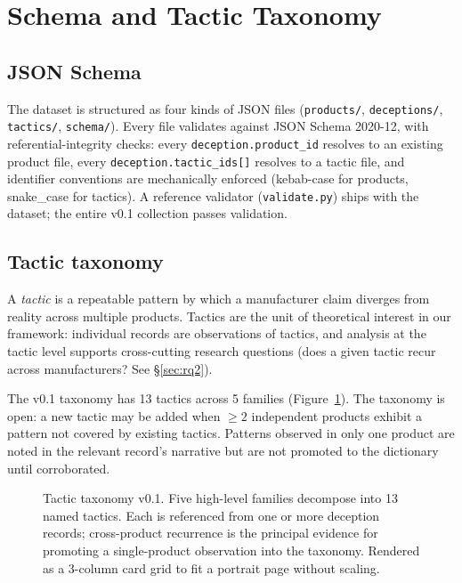 \documentclass{article}
\begin{document}
\section{Schema and Tactic Taxonomy}\label{sec:taxonomy}

\subsection{JSON Schema}\label{sec:schema}

The dataset is structured as four kinds of JSON files (\texttt{products/}, \texttt{deceptions/}, \texttt{tactics/}, \texttt{schema/}). Every file validates against JSON Schema 2020-12, with referential-integrity checks: every \texttt{deception.product\_id} resolves to an existing product file, every \texttt{deception.tactic\_ids[]} resolves to a tactic file, and identifier conventions are mechanically enforced (kebab-case for products, snake\_case for tactics). A reference validator (\texttt{validate.py}) ships with the dataset; the entire v0.1 collection passes validation.

\subsection{Tactic taxonomy}

A \emph{tactic} is a repeatable pattern by which a manufacturer claim diverges from reality across multiple products. Tactics are the unit of theoretical interest in our framework: individual records are observations of tactics, and analysis at the tactic level supports cross-cutting research questions (does a given tactic recur across manufacturers? See \S\ref{sec:rq2}).

The v0.1 taxonomy has 13 tactics across 5 families (Figure~\ref{fig:taxonomy}). The taxonomy is open: a new tactic may be added when $\geq 2$ independent products exhibit a pattern not covered by existing tactics. Patterns observed in only one product are noted in the relevant record's narrative but are not promoted to the dictionary until corroborated.

\begin{figure}[!htbp]
\centering

\caption{Tactic taxonomy v0.1. Five high-level families decompose into 13 named tactics. Each is referenced from one or more deception records; cross-product recurrence is the principal evidence for promoting a single-product observation into the taxonomy. Rendered as a 3-column card grid to fit a portrait page without scaling.}
\label{fig:taxonomy}
\end{figure}
\FloatBarrier
\end{document}
